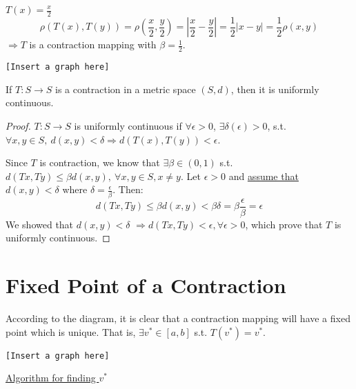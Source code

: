 \documentclass[twoside]{article}
\newcommand\imp{$\Longrightarrow$}
\begin{document}
\begin{example}
    $T(x) = \frac{x}{2}$
    \[
        \rho(T(x), T(y)) = \rho\left (\frac{x}{2}, \frac{y}{2} \right ) = \left |\frac{x}{2} - \frac{y}{2} \right | = \frac{1}{2} \left | x-y \right | = \frac{1}{2} \rho(x,y)
    \]
    \imp $T$ is a contraction mapping with $\beta = \frac{1}{2}$.
    \begin{center}
    \texttt{[Insert a graph here]}
    \end{center}
\end{example}

\begin{theorem}
    If $T:S \to S$ is a contraction in a metric space $(S,d)$, then it is uniformly continuous.
\end{theorem}
\begin{proof}
    $T:S\to S$ is uniformly continuous if $\forall \epsilon > 0$, $\exists \delta(\epsilon) > 0$, s.t. $\forall x,y \in S, ~ d(x,y) < \delta \Longrightarrow d(T(x),T(y)) < \epsilon$.

    Since $T$ is contraction, we know that $\exists \beta \in (0,1)$ s.t. $d(Tx,Ty) \leq \beta d(x,y), ~ \forall x ,y \in S, x \neq y.$ Let $\epsilon > 0$ and \underline{assume that $d(x,y) < \delta$} where $\delta = \frac{\epsilon}{\beta}$. Then:
    \[
     d(Tx,Ty) \leq \beta d(x,y) < \beta \delta = \beta \frac{\epsilon}{\beta} = \epsilon
     \] 
     We showed that $d(x,y) < \delta$ \imp $d(Tx,Ty)  < \epsilon, \forall \epsilon > 0$, which prove that $T$ is uniformly continuous.
\end{proof}

\section{Fixed Point of a Contraction}
According to the diagram, it is clear that a contraction mapping will have a fixed point which is unique. That is, $\exists v^{*} \in [a,b]$ s.t. $T(v^{*}) = v^{*}$.
\begin{center}
    \texttt{[Insert a graph here]}
\end{center}

\underline{Algorithm for finding $v^{*}$}
\end{document}
